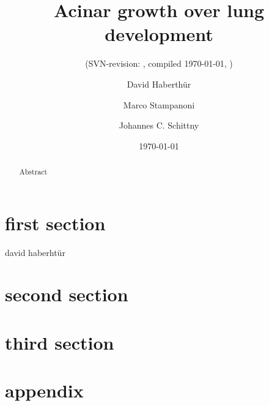 \documentclass[a4paper,twoside,abstract=true,english,pdftex]{scrartcl}
\title{Acinar growth over lung development}
\author{David Haberthür \and Marco Stampanoni \and Johannes C. Schittny}
\subtitle{(SVN-revision: \svnkw{LastChangedRevision}, compiled \today, \thistime)}
\date{\today}
\newif\ifhtml
\begin{document}
\maketitle
 
\begin{abstract}
Abstract
\end{abstract}
 
\ifhtml
	\emph{Did you sort out all todos?}
\else
	\listoftodos
\fi
 
\section{first section}
david haberhtür 
\lipsum[1]
 
\section{second section}
\lipsum[1]
 
\section{third section}
\lipsum[1]
 

 
\appendix
\section{appendix}
\lipsum[1]
 
\end{document}
